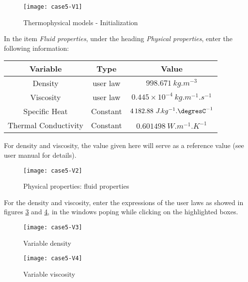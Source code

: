 \begin{figure}[h!]
\begin{center}
\texttt{[image: case5-V1]}
\caption{Thermophysical models - Initialization}
\label{fig1_e5}
\end{center}
\end{figure}


\newpage
In the item {\itshape Fluid properties}, under the heading {\itshape Physical
properties}, enter the following information:

\begin{center}
\begin{tabular}{|c|c|c|}
\hline
Variable & Type & Value \\
\hline
\hline
Density & user law & $998.671\ kg.m^{-3} $ \\
\hline
Viscosity & user law & $0.445\times 10^{-4}\ kg.m^{-1}.s^{-1} $ \\
\hline
Specific Heat & Constant & $4\,182.88\ J.kg^{-1}.\mbox{\degresC}^{-1} $ \\
\hline
Thermal Conductivity & Constant & $0.601498\ W.m^{-1}.K^{-1}$\\
\hline
\end{tabular}
\end{center}

For density and viscosity, the value given here will serve as a reference
value (see user manual for details).

\begin{figure}[h!]
\begin{center}
\texttt{[image: case5-V2]}
\caption{Physical properties: fluid properties}
\label{fig2_e5}
\end{center}
\end{figure}

\newpage
For the density and viscosity, enter the expressions of the user laws as showed in
figures \ref{fig5_var1} and \ref{fig5_var2}, in the windows poping while clicking on the highlighted boxes.

\begin{figure}[h!]
\begin{center}
\texttt{[image: case5-V3]}
\caption{Variable density}
\label{fig5_var1}
\end{center}
\end{figure}

\begin{figure}[h!]
\begin{center}
\texttt{[image: case5-V4]}
\caption{Variable viscosity}
\label{fig5_var2}
\end{center}
\end{figure}

